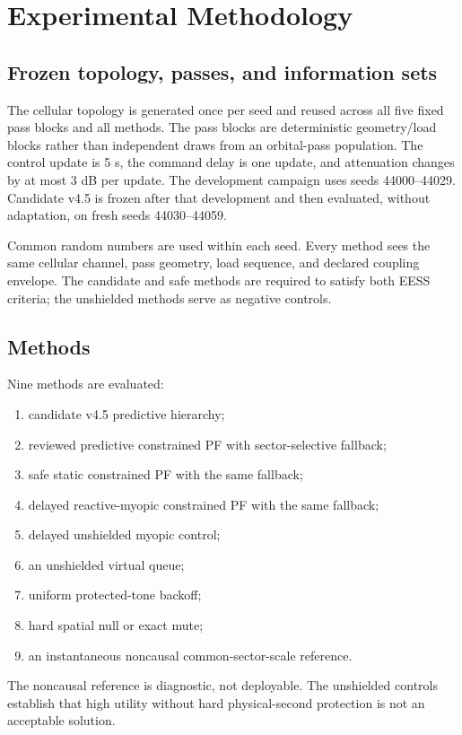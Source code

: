 \documentclass[journal]{IEEEtran}
\begin{document}
\section{Experimental Methodology}
\subsection{Frozen topology, passes, and information sets}
The cellular topology is generated once per seed and reused across all five fixed pass blocks and all methods. The pass blocks are deterministic geometry/load blocks rather than independent draws from an orbital-pass population. The control update is 5 s, the command delay is one update, and attenuation changes by at most 3 dB per update. The development campaign uses seeds 44000--44029. Candidate v4.5 is frozen after that development and then evaluated, without adaptation, on fresh seeds 44030--44059.

Common random numbers are used within each seed. Every method sees the same cellular channel, pass geometry, load sequence, and declared coupling envelope. The candidate and safe methods are required to satisfy both EESS criteria; the unshielded methods serve as negative controls.

\subsection{Methods}
Nine methods are evaluated:
\begin{enumerate}
\item candidate v4.5 predictive hierarchy;
\item reviewed predictive constrained PF with sector-selective fallback;
\item safe static constrained PF with the same fallback;
\item delayed reactive-myopic constrained PF with the same fallback;
\item delayed unshielded myopic control;
\item an unshielded virtual queue;
\item uniform protected-tone backoff;
\item hard spatial null or exact mute;
\item an instantaneous noncausal common-sector-scale reference.
\end{enumerate}
The noncausal reference is diagnostic, not deployable. The unshielded controls establish that high utility without hard physical-second protection is not an acceptable solution.
\end{document}
